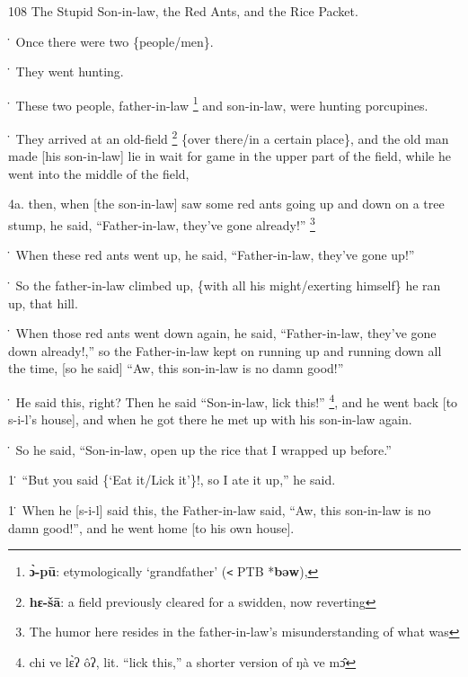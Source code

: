 
108 The Stupid Son-in-law, the Red Ants, and the Rice Packet.

\. Once there were two \{people/men\}.

\. They went hunting.

\. These two people, father-in-law \footnote{\textbf{ɔ̀-pū}: etymologically `grandfather' (\texttt{<} PTB *\textbf{bəw}),} and son-in-law, were hunting porcupines.

\. They arrived at an old-field \footnote{\textbf{hɛ-šā}: a field previously cleared for a swidden, now reverting} \{over there/in a certain place\}, and the
old man made [his son-in-law] lie in wait for game in the upper part of the field,
while he went into the middle of the field,

4a. then, when [the son-in-law] saw some red ants going up and down on a tree stump,
he said, ``Father-in-law, they've gone already!'' \footnote{The humor here resides in the father-in-law's misunderstanding of what was}

\. When these red ants went up, he said, ``Father-in-law, they've gone up!''

\. So the father-in-law climbed up, \{with all his might/exerting himself\} he
ran up, that hill.

\. When those red ants went down again, he said, ``Father-in-law, they've gone
down already!,'' so the Father-in-law kept on running up and running down all the
time, [so he said] ``Aw, this son-in-law is no damn good!''

\. He said this, right? Then he said ``Son-in-law, lick this!'' \footnote{chi ve lɛ̀ʔ ôʔ, lit. ``lick this,'' a shorter version of ŋà ve mɔ̂}, and he went
back [to s-i-l's house], and when he got there he met up with his son-in-law again.

\. So he said, ``Son-in-law, open up the rice that I wrapped up before.''

1\. ``But you said \{`Eat it/Lick it'\}!, so I ate it up,'' he said.

1\. When he [s-i-l] said this, the Father-in-law said, ``Aw, this son-in-law is
no damn good!'', and he went home [to his own house].

